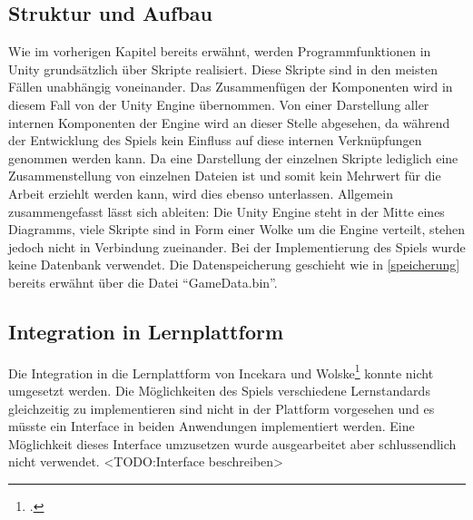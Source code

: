 \subsection{Struktur und Aufbau}
Wie im vorherigen Kapitel bereits erwähnt, werden Programmfunktionen in Unity grundsätzlich über Skripte realisiert. Diese Skripte sind in den meisten Fällen unabhängig voneinander. Das Zusammenfügen der Komponenten wird in diesem Fall von der Unity Engine übernommen. Von einer Darstellung aller internen Komponenten der Engine wird an dieser Stelle abgesehen, da während der Entwicklung des Spiels kein Einfluss auf diese internen Verknüpfungen genommen werden kann. Da eine Darstellung der einzelnen Skripte lediglich eine Zusammenstellung von einzelnen Dateien ist und somit kein Mehrwert für die Arbeit erziehlt werden kann, wird dies ebenso unterlassen. Allgemein zusammengefasst lässt sich ableiten: Die Unity Engine steht in der Mitte eines Diagramms, viele Skripte sind in Form einer Wolke um die Engine verteilt, stehen jedoch nicht in Verbindung zueinander.
Bei der Implementierung des Spiels wurde keine Datenbank verwendet. Die Datenspeicherung geschieht wie in \ref{speicherung} bereits erwähnt über die Datei \enquote{GameData.bin}.

\subsection{Integration in Lernplattform}
	Die Integration in die Lernplattform von Incekara und Wolske\footcite{lernplattform} konnte nicht umgesetzt werden. Die Möglichkeiten des Spiels verschiedene Lernstandards gleichzeitig zu implementieren sind nicht in der Plattform vorgesehen und es müsste ein Interface in beiden Anwendungen implementiert werden.
	Eine Möglichkeit dieses Interface umzusetzen wurde ausgearbeitet aber schlussendlich nicht verwendet.
	<TODO:Interface beschreiben>

